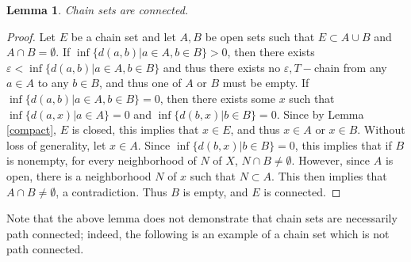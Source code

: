 \documentclass[11pt]{article}
\newtheorem{lem}[thm]{Lemma}
\begin{document}
\begin{lem}\label{chainconnected}
Chain sets are connected.
\end{lem}
\begin{proof}
Let $E$ be a chain set and let $A,B$ be open sets such that $E\subset A\cup B$ and $A\cap B=\emptyset$.  If $\inf\{d(a,b)|a\in A, b\in B\}>0$, then there exists $\varepsilon<\inf\{d(a,b)|a\in A, b\in B\}$ and thus there exists no $\varepsilon, T-$chain from any $a\in A$ to any $b\in B$, and thus one of $A$ or $B$ must be empty.  If $\inf\{d(a,b)|a\in A, b\in B\}=0$, then there exists some $x$ such that $\inf\{d(a,x)|a\in A\}=0$ and $\inf\{d(b,x)|b\in B\}=0$.  Since by Lemma \ref{compact}, $E$ is closed, this implies that $x\in E$, and thus $x\in A$ or $x\in B$.  Without loss of generality, let $x\in A$.  Since $\inf\{d(b,x)|b\in B\}=0$, this implies that if $B$ is nonempty, for every neighborhood of $N$ of $X$, $N\cap B\not= \emptyset$.  However, since $A$ is open, there is a neighborhood $N$ of $x$ such that $N\subset A$.  This then implies that $A\cap B\not = \emptyset$, a contradiction.  Thus $B$ is empty, and $E$ is connected.

\end{proof}


\noindent Note that the above lemma does not demonstrate that chain sets are necessarily path connected; indeed, the following is an example of a chain set which is not path connected. 
\end{document}
